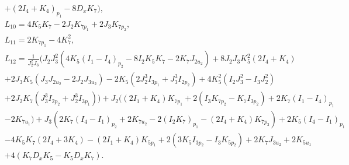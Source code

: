 \documentclass[12pt]{article}
\begin{document}
\begin{equation}
\begin{aligned}
&+(2I_4+K_4)_{p_1}-8D_xK_7\bigg),\\
&L_{10}=4K_5K_7-2J_2K_{7p_1}+2J_3K_{7p_2},\\
&L_{11}=2K_{7p_1}-4K_7^2,\\
&L_{12}=\frac{1}{J_2^2J_3}\bigg(J_2J_3^2(4K_5(I_1-I_4)_{p_2}-8I_2K_5K_7-2K_7J_{2u_2})+8J_2J_3K_5^2(2I_4+K_4)\\
&+2J_3K_5(J_3J_{2u_2}-2J_2J_{3u_2})-2K_5(2J_2^3I_{3p_1}+J_3^3I_{2p_2})+4K_5^2(I_2J_3^2-I_3J_2^2)\\
&+2J_2K_7(J_3^3I_{2p_2}+J_2^3I_{3p_1})\bigg)+J_2((2I_1+K_4)K_{7p_1}+2(I_3K_{7p_2}-K_7I_{3p_2})+2K_7(I_1-I_4)_{p_1}\\
&-2K_{7u_1})+J_3(2K_7(I_4-I_1)_{p_2}+2K_{7u_2}-2(I_2K_7)_{p_1}-(2I_4+K_4)K_{7p_2})+2K_5(I_4-I_1)_{p_1}\\
&-4K_5K_7(2I_4+3K_4)-(2I_1+K_4)K_{5p_1}+2(3K_5I_{3p_2}-I_3K_{5p_2})+2K_7J_{3u_2}+2K_{5u_1}\\
&+4(K_7D_xK_5-K_5D_xK_7).\\
\end{aligned}
\end{equation}

\end{document}
